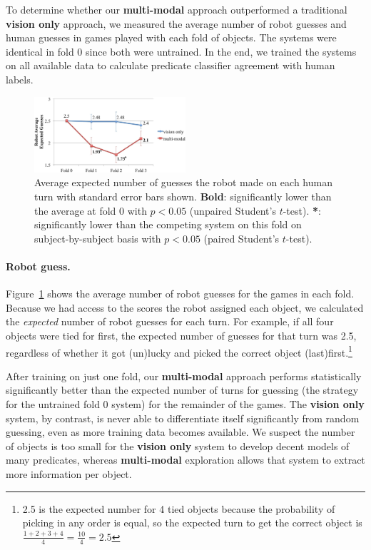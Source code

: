 To determine whether our \textbf{multi-modal} approach outperformed a traditional \textbf{vision only} approach, we measured the average number of robot guesses and human guesses in games played with each fold of objects.
The systems were identical in fold 0 since both were untrained.
In the end, we trained the systems on all available data to calculate predicate classifier agreement with human labels.

\begin{figure}
\centering
\includegraphics[width=0.5\textwidth]{figures/robot_guesses_error_bars.jpg}
\caption{Average expected number of guesses the robot made on each human turn with standard error bars shown.
\textbf{Bold}: significantly lower than the average at fold 0 with $p<0.05$ (unpaired Student's $t$-test).
\textbf{*}: significantly lower than the competing system on this fold on subject-by-subject basis with $p<0.05$ (paired Student's $t$-test).}
\label{fig:robot_guesses}
\end{figure}

\paragraph{Robot guess.}
Figure~\ref{fig:robot_guesses} shows the average number of robot guesses for the games in each fold. Because we had access to the scores the robot assigned each object, we calculated the {\it expected} number of robot guesses for each turn.
For example, if all four objects were tied for first, the expected number of guesses for that turn was 2.5, regardless of whether it got (un)lucky and picked the correct object (last)first.\footnote{2.5 is the expected number for 4 tied objects because the probability of picking in any order is equal, so the expected turn to get the correct object is $\frac{1+2+3+4}{4} = \frac{10}{4} = 2.5$}

After training on just one fold, our \textbf{multi-modal} approach performs statistically significantly better than the expected number of turns for guessing (the strategy for the untrained fold 0 system) for the remainder of the games.
The \textbf{vision only} system, by contrast, is never able to differentiate itself significantly from random guessing, even as more training data becomes available.
We suspect the number of objects is too small for the \textbf{vision only} system to develop decent models of many predicates, whereas \textbf{multi-modal} exploration allows that system to extract more information per object.

